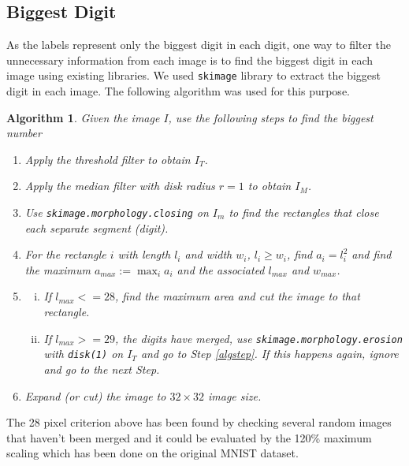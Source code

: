 \documentclass[letterpaper, 10 pt, conference]{ieeeconf}  %
\newtheorem{alg}[thm]{Algorithm}
\begin{document}
\subsection{Biggest Digit}
As the labels represent only the biggest digit in each digit, one way to filter the unnecessary information from each image is to find the biggest digit in each image using existing libraries. We used \texttt{skimage} library to extract the biggest digit in each image. The following algorithm was used for this purpose.
\begin{alg}
	Given the image $I$, use the following steps to find the biggest number
	\begin{enumerate}[{Step} 1]
		\item Apply the threshold filter to obtain $I_T$.
		\item Apply the median filter with disk radius $r=1$ to obtain $I_M$.
		\item Use \texttt{skimage.morphology.closing} on $I_m$ to find the rectangles that close each separate segment (digit).\label{algstep}
		\item For the rectangle $i$ with length $l_i$ and width $w_i$, $l_i\ge w_i$, find $a_i=l_i^2$ and find the maximum $a_{max}:=\max_i a_i$ and the associated $l_{max}$ and $w_{max}$.
		\item 
		\begin{enumerate}[(i)]
			\item If $l_{max}<=28$, find the maximum area and cut the image to that rectangle.
			\item If $l_{max}>=29$, the digits have merged, use \texttt{skimage.morphology.erosion} with \texttt{disk(1)} on $I_T$ and go to Step \ref{algstep}. If this happens again, ignore and go to the next Step.
		\end{enumerate}
		\item Expand (or cut) the image to $32\times 32$ image size.
	\end{enumerate}
\end{alg}

The 28 pixel criterion above has been found by checking several random images that haven't been merged and it could be evaluated by the 120\% maximum scaling which has been done on the original MNIST dataset. 
\end{document}
